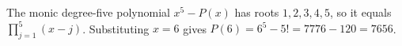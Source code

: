 The monic degree-five polynomial $x^5-P(x)$ has roots $1,2,3,4,5$, so it equals $\prod_{j=1}^5(x-j)$. Substituting $x=6$ gives $P(6)=6^5-5!=7776-120=\boxed{7656}$.
